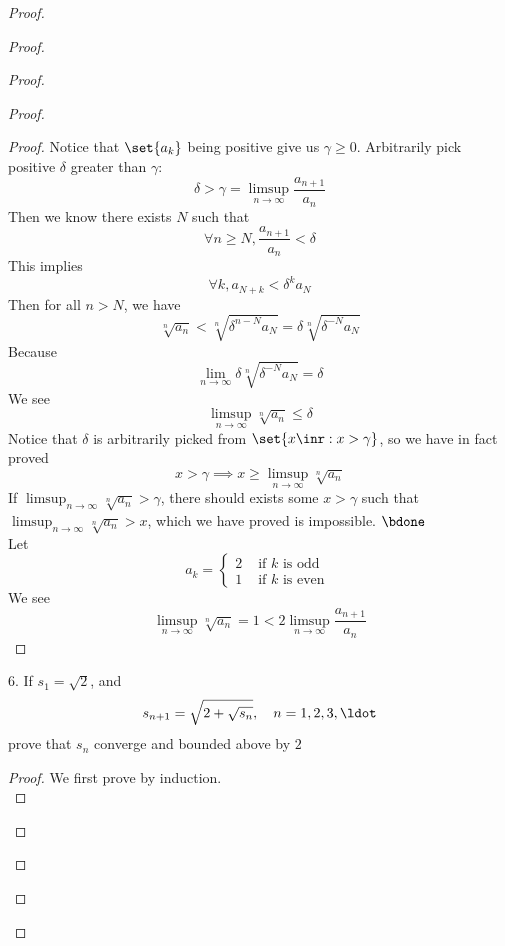 \documentclass{report}
\begin{document}
\begin{proof}
\begin{proof}
\begin{proof}
\begin{proof}
\begin{proof}
Notice that $\set{a_k}$ being positive give us $\gamma \geq 0$. Arbitrarily pick positive $\delta$ greater than $\gamma $:
\begin{equation*}
\delta>\gamma =\limsup_{n\to\infty} \frac{a_{n+1}}{a_n}
\end{equation*}
Then we know there exists $N$ such that
 \begin{equation*}
\forall n\geq N, \frac{a_{n+1}}{a_n}<\delta 
\end{equation*}
This implies
\begin{equation*}
\forall k,a_{N+k}<\delta^k a_N
\end{equation*}
Then for all $n>N$, we have
 \begin{equation*}
\sqrt[n]{a_n}<\sqrt[n]{\delta^{n-N}a_N}=\delta \sqrt[n]{\delta^{-N}a_N} 
\end{equation*}
Because
\begin{equation*}
\lim_{n\to\infty}\delta \sqrt[n]{\delta ^{-N}a_N} =\delta 
\end{equation*}
We see
\begin{equation*}
\limsup_{n\to\infty} \sqrt[n]{a_n}\leq \delta 
\end{equation*}
Notice that $\delta $ is arbitrarily picked from $\set{x\inr:x>\gamma }$, so we have in fact proved
\begin{equation*}
x>\gamma \implies x\geq \limsup_{n\to\infty} \sqrt[n]{a_n} 
\end{equation*}
If $\limsup_{n\to\infty} \sqrt[n]{a_n} >\gamma $, there should exists some $x>\gamma $ such that $\limsup_{n\to\infty} \sqrt[n]{a_n}>x$, which we have proved is impossible. $\bdone$\\

Let
\begin{equation*}
a_k=\begin{cases}
  2& \text{ if  }k\text{ is odd }\\
  1& \text{ if $k$ is even }
\end{cases}
\end{equation*}
We see 
\begin{equation*}
\limsup_{n\to\infty} \sqrt[n]{a_n}=1 <2\limsup_{n\to\infty} \frac{a_{n+1}}{a_n}
\end{equation*}
\end{proof}
\begin{question}{}{}
6. If $s_1 = \sqrt{2}$, and
\begin{equation*}
s_{n+1} =  \sqrt{2+\sqrt{s_n}}, \quad n = 1, 2, 3, \ldot
\end{equation*}
prove that $s_n$ converge and bounded above by $2$
\end{question}
\begin{proof}
We first prove  by induction.\\


\end{proof}
\end{proof}
\end{proof}
\end{proof}
\end{proof}
\end{document}
